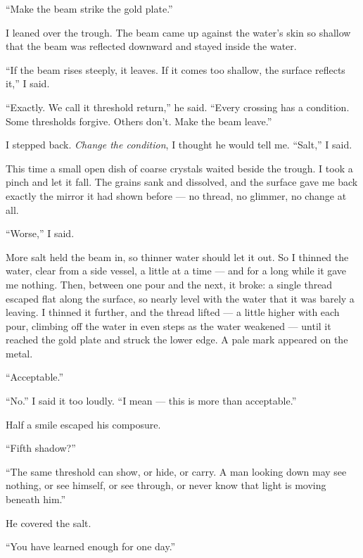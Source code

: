 ``Make the beam strike the gold plate.''\par

I leaned over the trough. The beam came up against the water's skin so shallow that the beam was reflected downward and stayed inside the water.\par

``If the beam rises steeply, it leaves. If it comes too shallow, the surface reflects it,'' I said. \par

``Exactly. We call it threshold return,'' he said. ``Every crossing has a condition. Some thresholds forgive. Others don't. Make the beam leave.''\par

I stepped back. \textit{Change the condition}, I thought he would tell me. ``Salt,'' I said.\par

This time a small open dish of coarse crystals waited beside the trough. I took a pinch and let it fall. The grains sank and dissolved, and the surface gave me back exactly the mirror it had shown before --- no thread, no glimmer, no change at all.\par

``Worse,'' I said.\par

More salt held the beam in, so thinner water should let it out. So I thinned the water, clear from a side vessel, a little at a time --- and for a long while it gave me nothing. Then, between one pour and the next, it broke: a single thread escaped flat along the surface, so nearly level with the water that it was barely a leaving. I thinned it further, and the thread lifted --- a little higher with each pour, climbing off the water in even steps as the water weakened --- until it reached the gold plate and struck the lower edge. A pale mark appeared on the metal.\par

``Acceptable.''\par
``No.'' I said it too loudly. ``I mean --- this is more than acceptable.''\par

Half a smile escaped his composure. \par

``Fifth shadow?''\par
``The same threshold can show, or hide, or carry. A man looking down may see nothing, or see himself, or see through, or never know that light is moving beneath him.''\par
He covered the salt.\par
``You have learned enough for one day.''\par

